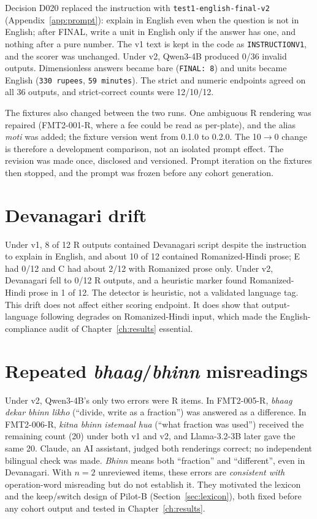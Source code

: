 \documentclass[12pt,a4paper,oneside]{report}
\renewcommand{\_}{\oldunderscore\allowbreak}
\begin{document}
Decision D020 replaced the instruction with \texttt{test1-english-final-v2} (Appendix~\ref{app:prompt}): explain in English even when the question is not in English; after FINAL, write a unit in English only if the answer has one, and nothing after a pure number. The v1 text is kept in the code as \texttt{INSTRUCTION\_V1}, and the scorer was unchanged. Under v2, Qwen3-4B produced 0/36 invalid outputs. Dimensionless answers became bare (\texttt{FINAL: 8}) and units became English (\texttt{330 rupees}, \texttt{59 minutes}). The strict and numeric endpoints agreed on all 36 outputs, and strict-correct counts were 12/10/12.

The fixtures also changed between the two runs. One ambiguous R rendering was repaired (FMT2-001-R, where a fee could be read as per-plate), and the alias \emph{moti} was added; the fixture version went from 0.1.0 to 0.2.0. The 10$\to$0 change is therefore a development comparison, not an isolated prompt effect. The revision was made once, disclosed and versioned. Prompt iteration on the fixtures then stopped, and the prompt was frozen before any cohort generation.

\section{Devanagari drift}

Under v1, 8 of 12 R outputs contained Devanagari script despite the instruction to explain in English, and about 10 of 12 contained Romanized-Hindi prose; E had 0/12 and C had about 2/12 with Romanized prose only. Under v2, Devanagari fell to 0/12 R outputs, and a heuristic marker found Romanized-Hindi prose in 1 of 12. The detector is heuristic, not a validated language tag. This drift does not affect either scoring endpoint. It does show that output-language following degrades on Romanized-Hindi input, which made the English-compliance audit of Chapter~\ref{ch:results} essential.

\section{Repeated \emph{bhaag}/\emph{bhinn} misreadings}

Under v2, Qwen3-4B's only two errors were R items. In FMT2-005-R, \emph{bhaag dekar bhinn likho} (``divide, write as a fraction'') was answered as a difference. In FMT2-006-R, \emph{kitna bhinn istemaal hua} (``what fraction was used'') received the remaining count (20) under both v1 and v2, and Llama-3.2-3B later gave the same 20. Claude, an AI assistant, judged both renderings correct; no independent bilingual check was made. \emph{Bhinn} means both ``fraction'' and ``different'', even in Devanagari. With $n=2$ unreviewed items, these errors are \emph{consistent with} operation-word misreading but do not establish it. They motivated the lexicon and the keep/switch design of Pilot-B (Section~\ref{sec:lexicon}), both fixed before any cohort output and tested in Chapter~\ref{ch:results}.
\end{document}
